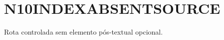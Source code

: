 \documentclass{abntexto-ufc}
\begin{document}
\textual
\section{N10INDEXABSENTSOURCE}
Rota controlada sem elemento pós-textual opcional.

\imprimirindice
\end{document}
